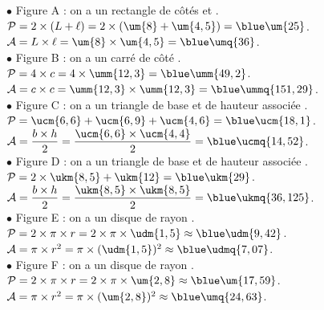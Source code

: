    \textcolor{G1}{$\bullet$} Figure A : on a un rectangle de côtés  et . \\
      $\mathcal{P} =2\times(L+\ell) =2\times(\um{8}+\um{4,5}) =\blue\um{25}$. \\
      $\mathcal{A} =L\times\ell =\um{8}\times\um{4,5} =\blue\umq{36}$. \\
   \textcolor{G1}{$\bullet$} Figure B : on a un carré de côté . \\
      $\mathcal{P} =4\times c =4\times\umm{12,3} =\blue\umm{49,2}$. \\
      $\mathcal{A} =c\times c =\umm{12,3}\times\umm{12,3} =\blue\ummq{151,29}$. \\
   \textcolor{G1}{$\bullet$} Figure C : on a un triangle de base  et de hauteur associée . \\
      $\mathcal{P} =\ucm{6,6}+\ucm{6,9}+\ucm{4,6} =\blue \ucm{18,1}$. \\ [1mm]
      $\mathcal{A} =\dfrac{b\times h}{2} =\dfrac{\ucm{6,6}\times\ucm{4,4}}{2}=\blue \ucmq{14,52}$. \\ [1mm]
   \textcolor{G1}{$\bullet$} Figure D : on a un triangle de base  et de hauteur associée . \\
      $\mathcal{P} =2\times\ukm{8,5}+\ukm{12} =\blue \ukm{29}$. \\ [1mm]
      $\mathcal{A} =\dfrac{b\times h}{2}  =\dfrac{\ukm{8,5}\times\ukm{8,5}}{2}=\blue \ukmq{36,125}$. \\ [1mm]
   \textcolor{G1}{$\bullet$}  Figure E : on a un disque de rayon . \\
      $\mathcal{P} =2\times\pi\times r =2\times\pi\times\udm{1,5} \approx\blue \udm{9,42}$. \\
      $\mathcal{A} =\pi\times r^2 =\pi\times(\udm{1,5})^2 \approx\blue \udmq{7,07}$. \\
   \textcolor{G1}{$\bullet$}  Figure F : on a un disque de rayon . \\
      $\mathcal{P} =2\times\pi\times r =2\times\pi\times\um{2,8} \approx\blue \um{17,59}$. \\
      $\mathcal{A} =\pi\times r^2 =\pi\times(\um{2,8})^2 \approx\blue \umq{24,63}$. \\
